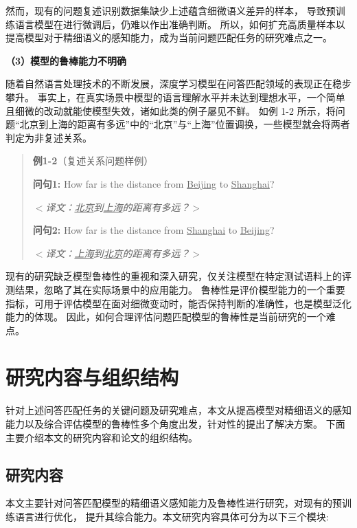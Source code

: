 然而，现有的问题复述识别数据集缺少上述蕴含细微语义差异的样本，
导致预训练语言模型在进行微调后，仍难以作出准确判断。
所以，如何扩充高质量样本以提高模型对于精细语义的感知能力，成为当前问题匹配任务的研究难点之一。

\textbf{\songti （3）模型的鲁棒能力不明确}

随着自然语言处理技术的不断发展，深度学习模型在问答匹配领域的表现正在稳步攀升。
事实上，在真实场景中模型的语言理解水平并未达到理想水平，一个简单且细微的改动就能使模型失效，诸如此类的例子屡见不鲜。
如例 1-2 所示，将问题{\kai“北京到上海的距离有多远”}中的{\kai“北京”}与{\kai“上海”}位置调换，一些模型就会将两者判定为非复述关系。
\begin{quotation}
    \noindent \textbf{\songti 例1-2}（复述关系问题样例）
    
    \noindent \textbf{问句1:} How far is the distance from \underline{Beijing} to \underline{Shanghai}?
    
    \noindent $<$\textit{译文：\underline{北京}到\underline{上海}的距离有多远？}$>$
    
    \noindent \textbf{问句2:} How far is the distance from \underline{Shanghai} to \underline{Beijing}?
    
    \noindent $<$\textit{译文：\underline{上海}到\underline{北京}的距离有多远？}$>$
    
\end{quotation}

现有的研究缺乏模型鲁棒性的重视和深入研究，仅关注模型在特定测试语料上的评测结果，忽略了其在实际场景中的应用能力。
鲁棒性是评价模型能力的一个重要指标，可用于评估模型在面对细微变动时，能否保持判断的准确性，也是模型泛化能力的体现。
因此，如何合理评估问题匹配模型的鲁棒性是当前研究的一个难点。


\section{研究内容与组织结构}

针对上述问答匹配任务的关键问题及研究难点，本文从提高模型对精细语义的感知能力以及综合评估模型的鲁棒性多个角度出发，针对性的提出了解决方案。
下面主要介绍本文的研究内容和论文的组织结构。

\subsection{研究内容}

本文主要针对问答匹配模型的精细语义感知能力及鲁棒性进行研究，对现有的预训练语言进行优化，
提升其综合能力。本文研究内容具体可分为以下三个模块:

